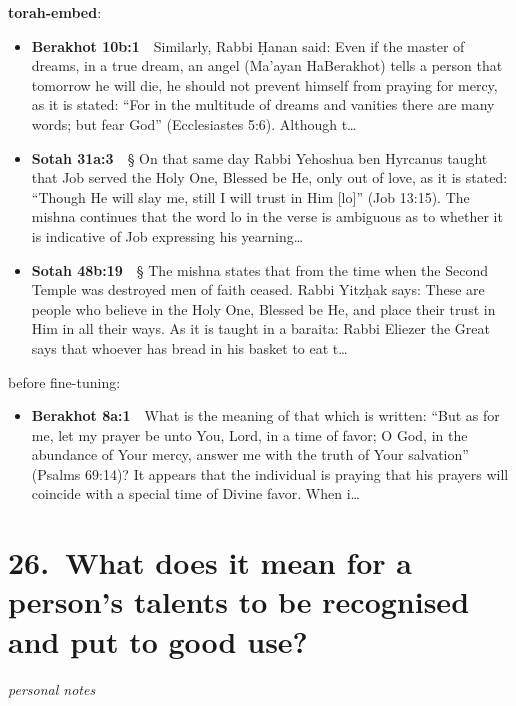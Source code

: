 \documentclass[11pt,a4paper]{article}
\begin{document}
{\color{quiet}\small\textbf{torah-embed}:}
\begin{itemize}[leftmargin=1.2em,itemsep=3pt]
\item {\color{ref}\textbf{Berakhot 10b:1}}\ \ Similarly, Rabbi Ḥanan said: Even if the master of dreams, in a true dream, an angel (Ma’ayan HaBerakhot) tells a person that tomorrow he will die, he should not prevent himself from praying for mercy, as it is stated: “For in the multitude of dreams and vanities there are many words; but fear God” (Ecclesiastes 5:6). Although t\ldots
\item {\color{ref}\textbf{Sotah 31a:3}}\ \ § On that same day Rabbi Yehoshua ben Hyrcanus taught that Job served the Holy One, Blessed be He, only out of love, as it is stated: “Though He will slay me, still I will trust in Him [lo]” (Job 13:15). The mishna continues that the word lo in the verse is ambiguous as to whether it is indicative of Job expressing his yearning\ldots
\item {\color{ref}\textbf{Sotah 48b:19}}\ \ § The mishna states that from the time when the Second Temple was destroyed men of faith ceased. Rabbi Yitzḥak says: These are people who believe in the Holy One, Blessed be He, and place their trust in Him in all their ways. As it is taught in a baraita: Rabbi Eliezer the Great says that whoever has bread in his basket to eat t\ldots
\end{itemize}
{\color{quiet}\small before fine-tuning:}
\begin{itemize}[leftmargin=1.2em]
\item {\color{ref}\textbf{Berakhot 8a:1}}\ \ What is the meaning of that which is written: “But as for me, let my prayer be unto You, Lord, in a time of favor; O God, in the abundance of Your mercy, answer me with the truth of Your salvation” (Psalms 69:14)? It appears that the individual is praying that his prayers will coincide with a special time of Divine favor. When i\ldots
\end{itemize}

\section*{26.\ What does it mean for a person's talents to be recognised and put to good use?}
{\color{quiet}\small\textit{personal notes}}
\end{document}
